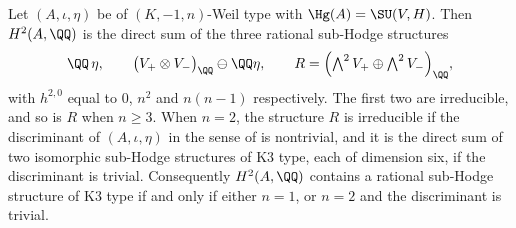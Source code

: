 \begin{proposition}%
\label{prop:normpart}
Let $(A,\iota,\eta)$ be of $(K,-1,n)$-Weil type with $\Hg(A)=\SU(V,H)$. Then
$H^{2}(A,\QQ)$ is the direct sum of the three rational sub-Hodge structures
\[
  \QQ\,\eta,
  \qquad
  \bigl(V_{+}\otimes V_{-}\bigr)_{\QQ}\ominus\QQ\eta,
  \qquad
  R=\Bigl(\textstyle\bigwedge^{2}V_{+}\oplus\bigwedge^{2}V_{-}\Bigr)_{\QQ},
\]
with $h^{2,0}$ equal to $0$, $n^{2}$ and $n(n-1)$ respectively. The first two
are irreducible, and so is $R$ when $n\ge3$. When $n=2$, the structure $R$ is
irreducible if the discriminant of $(A,\iota,\eta)$ in the sense of
 is nontrivial, and it is the direct sum of two isomorphic
sub-Hodge structures of K3 type, each of dimension six, if the discriminant
is trivial. Consequently $H^{2}(A,\QQ)$ contains a rational sub-Hodge
structure of K3 type if and only if either $n=1$, or $n=2$ and the
discriminant is trivial.
\end{proposition}

